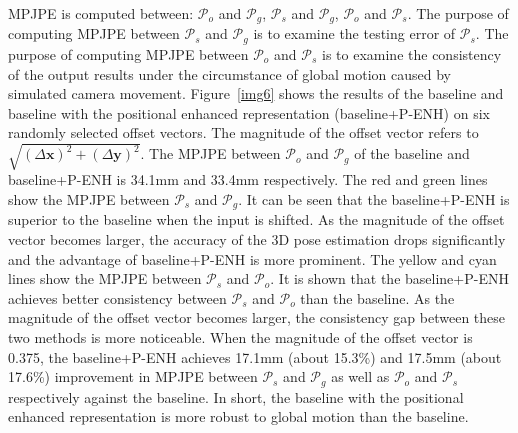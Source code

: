 \documentclass[sigconf]{acmart}
\begin{document}
MPJPE is computed between: $\mathcal{P}_{o}$ and $\mathcal{P}_{g}$, $\mathcal{P}_{s}$ and $\mathcal{P}_{g}$, $\mathcal{P}_{o}$ and $\mathcal{P}_{s}$. The purpose of computing MPJPE between $\mathcal{P}_{s}$ and $\mathcal{P}_{g}$ is to examine the testing error of $\mathcal{P}_{s}$. The purpose of computing MPJPE between $\mathcal{P}_{o}$ and $\mathcal{P}_{s}$ is to examine the consistency of the output results under the circumstance of global motion caused by simulated camera movement. Figure~\ref{img6} shows the results of the baseline and baseline with the positional enhanced representation (baseline+P-ENH) on six randomly selected offset vectors. The magnitude of the offset vector refers to $\sqrt{(\Delta\mathbf{x})^2+(\Delta\mathbf{y})^2}$. The MPJPE between $\mathcal{P}_{o}$ and $\mathcal{P}_{g}$ of the baseline and baseline+P-ENH is 34.1mm and 33.4mm respectively. The red and green lines show the MPJPE between $\mathcal{P}_{s}$ and $\mathcal{P}_{g}$. It can be seen that the baseline+P-ENH is superior to the baseline when the input is shifted. As the magnitude of the offset vector becomes larger, the accuracy of the 3D pose estimation drops significantly and the advantage of baseline+P-ENH is more prominent. The yellow and cyan lines show the MPJPE between $\mathcal{P}_{s}$ and $\mathcal{P}_{o}$. It is shown that the baseline+P-ENH achieves better consistency between $\mathcal{P}_{s}$ and $\mathcal{P}_{o}$ than the baseline. As the magnitude of the offset vector becomes larger, the consistency gap between these two methods is more noticeable. When the magnitude of the offset vector is 0.375, the baseline+P-ENH achieves 17.1mm (about 15.3\%) and 17.5mm (about 17.6\%) improvement in MPJPE between $\mathcal{P}_{s}$ and $\mathcal{P}_{g}$ as well as $\mathcal{P}_{o}$ and $\mathcal{P}_{s}$ respectively against the baseline. In short, the baseline with the positional enhanced representation is more robust to global motion than the baseline. \\
\end{document}
